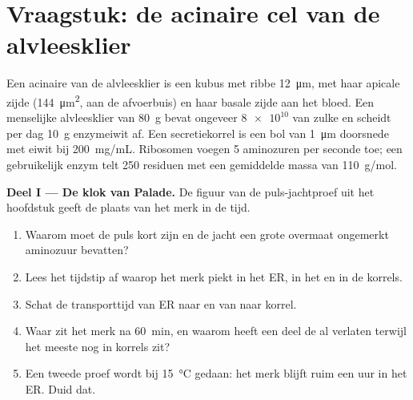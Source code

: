\section{Vraagstuk: de acinaire cel van de alvleesklier}

\begin{problem}
\label{pb:b1:eukaryotic-cell:1}
Een acinaire  van de alvleesklier is een kubus met ribbe \qty{12}{\micro m},
met haar apicale zijde (\qty{144}{\micro m^2}, aan de afvoerbuis) en haar basale
zijde aan het bloed. Een menselijke alvleesklier van \qty{80}{g} bevat ongeveer
$\num{8e10}$ van zulke  en scheidt per dag \qty{10}{g} enzymeiwit af. Een
secretiekorrel is een bol van \qty{1}{\micro m} doorsnede met eiwit bij
\qty{200}{mg/mL}. Ribosomen voegen \qty{5}{} aminozuren per seconde toe; een
gebruikelijk enzym telt \qty{250}{} residuen met een gemiddelde massa van
\qty{110}{g/mol}.

\medskip
\noindent\textbf{Deel I --- De klok van Palade.}
De figuur van de puls-jachtproef uit het hoofdstuk geeft de plaats van het merk in
de tijd.
\begin{enumerate}
  \item Waarom moet de puls kort zijn en de jacht een grote overmaat
        ongemerkt aminozuur bevatten?
  \item Lees het tijdstip af waarop het merk piekt in het ER, in het
         en in de korrels.
  \item Schat de transporttijd van ER naar  en van
         naar korrel.
  \item Waar zit het merk na \qty{60}{min}, en waarom heeft een deel de 
        al verlaten terwijl het meeste nog in korrels zit?
  \item Een tweede proef wordt bij \qty{15}{\celsius} gedaan: het merk
        blijft ruim een uur in het ER. Duid dat.
\end{enumerate}


\end{problem}
